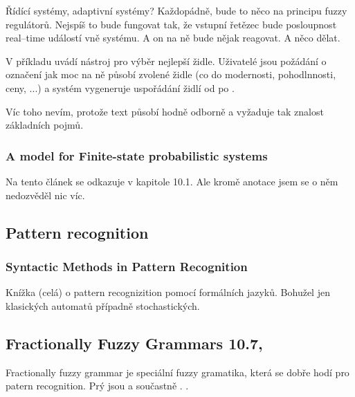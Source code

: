 \documentclass[a4paper,10pt]{article}
\begin{document}
Řídící systémy, adaptivní systémy? Každopádně, bude to něco na principu fuzzy regulátorů. Nejspíš to bude fungovat tak, že vstupní řetězec bude posloupnost real--time událostí vně systému. A on na ně bude nějak reagovat. A něco dělat.

\begin{definition}
\end{definition}

V příkladu uvádí nástroj pro výběr nejlepší židle. Uživatelé jsou požádání o označení jak moc na ně působí zvolené židle (co do modernosti, pohodlnnosti, ceny, ...) a systém vygeneruje uspořádání židlí od  po .

Víc toho nevím, protože text působí hodně odborně a vyžaduje tak znalost základních pojmů.


\subsubsection*{A model for Finite-state probabilistic systems \cite{BruFu-ModelFinStateProbSyss}}

Na tento článek se odkazuje \cite{MorMal-FuzzAutAndLangs} v kapitole 10.1. Ale kromě anotace jsem se o něm nedozvěděl nic víc.


\subsection{Pattern recognition}


\subsubsection*{Syntactic Methods in Pattern Recognition \cite{Fu-SynMethPattRec}}

Knížka (celá) o pattern recognizition pomocí formálních jazyků. Bohužel jen klasických automatů případně stochastických.


\subsection{Fractionally Fuzzy Grammars \cite{MorMal-FuzzAutAndLangs} 10.7, \cite{PalYau-FracFuzzGramAppPatRec}}

Fractionally fuzzy grammar je speciální fuzzy gramatika, která se dobře hodí pro patern recognition. Prý jsou  a součastně . .
\end{document}
